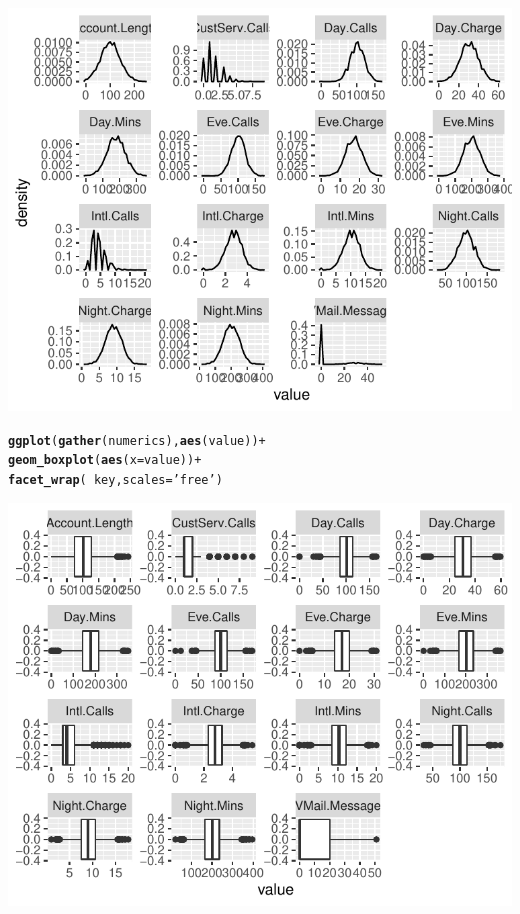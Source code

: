 \documentclass{article}\usepackage[]{graphicx}\usepackage[]{color}
\makeatletter
\def\maxwidth{ %
  \ifdim\Gin@nat@width>\linewidth
    \linewidth
  \else
    \Gin@nat@width
  \fi
}
\newcommand{\hlstr}[1]{\textcolor[rgb]{0.192,0.494,0.8}{#1}}%
\newcommand{\hlopt}[1]{\textcolor[rgb]{0,0,0}{#1}}%
\newcommand{\hlstd}[1]{\textcolor[rgb]{0.345,0.345,0.345}{#1}}%
\newcommand{\hlkwc}[1]{\textcolor[rgb]{0.333,0.667,0.333}{#1}}%
\newcommand{\hlkwd}[1]{\textcolor[rgb]{0.737,0.353,0.396}{\textbf{#1}}}%
\newenvironment{kframe}{%
 \def\at@end@of@kframe{}%
 \ifinner\ifhmode%
  \def\at@end@of@kframe{\end{minipage}}%
  \begin{minipage}{\columnwidth}%
 \fi\fi%
 \def\FrameCommand##1{\hskip\@totalleftmargin \hskip-\fboxsep
 \colorbox{shadecolor}{##1}\hskip-\fboxsep
     \hskip-\linewidth \hskip-\@totalleftmargin \hskip\columnwidth}%
 \MakeFramed {\advance\hsize-\width
   \@totalleftmargin\z@ \linewidth\hsize
   \@setminipage}}%
 {\par\unskip\endMakeFramed%
 \at@end@of@kframe}
\newenvironment{knitrout}{}{} %
\makeatother
\begin{document}
\begin{description}
\begin{knitrout}
{\centering \includegraphics[width=\maxwidth]{figure/Overviews_plots-2} 

}


\begin{kframe}\begin{alltt}
\hlkwd{ggplot}\hlstd{(}\hlkwd{gather}\hlstd{(numerics),} \hlkwd{aes}\hlstd{(value))} \hlopt{+}
  \hlkwd{geom_boxplot}\hlstd{(}\hlkwd{aes}\hlstd{(}\hlkwc{x}\hlstd{=value))} \hlopt{+}
  \hlkwd{facet_wrap}\hlstd{(}\hlopt{~}\hlstd{key,} \hlkwc{scales}\hlstd{=}\hlstr{'free'}\hlstd{)}
\end{alltt}
\end{kframe}

{\centering \includegraphics[width=\maxwidth]{figure/Overviews_plots-3} 

}
\end{knitrout}
\end{description}
\end{document}
